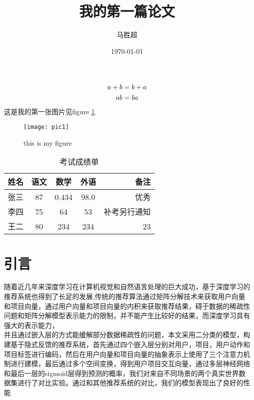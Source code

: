 \documentclass{article}%
\title{\heiti 我的第一篇论文}
\author{\kaishu 马胜超}
\date{\today}
\begin{document}
    \maketitle
    \tableofcontents%
    \begin{gather}%
    a+b=b+a\\
    ab=ba \notag%
    \end{gather}
    这是我的第一张图片见figure \ref {fig-pic1}.
    \begin{figure}[htbp]
    \centering
    \texttt{[image: pic1]}%
     \caption{this is my figure}\label{fig-pic1}

    \end{figure}
    \begin{table}
    \centering
    \caption{考试成绩单}
    \begin{tabular}{|l||c|c|c|r|}
    \hline
    姓名&语文&数学&外语&备注\\
    \hline \hline
    张三&87&0.434&98.0&优秀\\
    \hline
    李四&75&64&53&补考另行通知\\
    \hline
    王二& 80&234&234&23\\
    \hline
    \end{tabular}
    \end{table}
    \section{引言}
    随着近几年来深度学习在计算机视觉和自然语言处理的巨大成功，基于深度学习的推荐系统也得到了长足的发展,传统的推荐算法通过矩阵分解技术来获取用户向量和项目向量，通过用户向量和项目向量的内积来获取推荐结果，碍于数据的稀疏性问题和矩阵分解模型表示能力的限制，并不能产生比较好的结果，而深度学习具有强大的表示能力，\\并且通过嵌入层的方式能缓解部分数据稀疏性的问题，本文采用二分类的模型，构建基于隐式反馈的推荐系统，首先通过四个嵌入层分别对用户，项目，用户动作和项目标签进行编码，然后在用户向量和项目向量的抽象表示上使用了三个注意力机制进行建模，最后通过多个空间变换，得到用户项目交互向量，通过多层神经网络和最后一层的sigmoid层得到预测的概率，我们对来自不同场景的两个真实世界数据集进行了对比实验。通过和其他推荐系统的对比，我们的模型表现出了良好的性能
\end{document}

